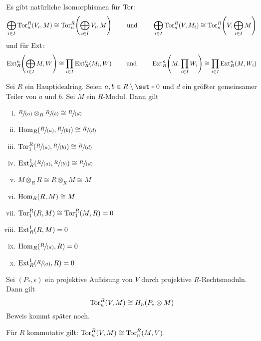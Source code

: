 \begin{bemerkung}
	Es gibt natürliche Isomorphismen für $\operatorname{Tor}$:
	\[
		\bigoplus_{i \in I} \Tor_n^R(V_i,M) \cong \Tor_n^R \enbrace*{\bigoplus_{i \in I} V_i, M} \qquad \text{ und } \qquad 
		\bigoplus_{i \in I} \Tor_n^R(V,M_i) \cong \Tor_n^R \enbrace*{V, \bigoplus_{i \in I} M} 
	\]
	und für $\operatorname{Ext}$:
	\[
		\Ext_R^n \enbrace*{\bigoplus_{i \in I} M,W} \cong \prod_{i \in I} \Ext_R^n(M_i,W) \qquad \text{ und } \qquad \Ext_R^n \enbrace*{M, \prod_{i \in I} W_i} \cong \prod_{i \in I} \Ext_R^n(M,W_i) 
	\]
\end{bemerkung}

\begin{bemerkung}
	Sei $R$ ein Hauptidealring. 
	Seien $a,b \in R\setminus \set*{0}$ und $d$ ein größter gemeinsamer Teiler von $a$ und $b$.
	Sei $M$ ein $R$-Modul.
	Dann gilt 
	\begin{multicols}{2}
		\begin{enumerate}[(i)]
			\item $\sfrac{R}{(a)} \otimes_R \sfrac{R}{(b)} \cong \sfrac{R}{(d)}$
			\item $\Hom_R \enbrace*{\sfrac{R}{(a)},\sfrac{R}{(b)}} \cong \sfrac{R}{(d)}$
			\item $\Tor_1^R \enbrace*{\sfrac{R}{(a)}, \sfrac{R}{(b)}} \cong \sfrac{R}{(d)}$
			\item $\Ext^1_R \enbrace*{\sfrac{R}{(a)}, \sfrac{R}{(b)}} \cong \sfrac{R}{(d)}$
			\item $M \otimes_R R \cong R \otimes_R M \cong M$
			\item $\operatorname{Hom}_R(R,M) \cong M$
			\item $\operatorname{Tor}^R_1(R,M) \cong \operatorname{Tor}_1^R(M,R)=0$
			\item $\operatorname{Ext}^1_R(R,M) =0$
			\item $\Hom_R \enbrace*{\sfrac{R}{(a)},R}=0$
			\item $\Ext_R^1 \enbrace*{\sfrac{R}{(a)},R}=0$
		\end{enumerate}
	\end{multicols}
\end{bemerkung}

\begin{bemerkung}
	Sei $(P_*,\epsilon)$ ein projektive Auflösung von $V$ durch projektive $R$-Rechtsmoduln.
	Dann gilt 
	\[
		\operatorname{Tor}_n^R(V,M) \cong H_n(P_* \otimes M)
	\]
	Beweis kommt später noch.
\end{bemerkung}

\begin{korollarB}
	Für $R$ kommutativ gilt: $\operatorname{Tor}_n^R(V,M) \cong \operatorname{Tor}_n^R(M,V)$.
\end{korollarB}

